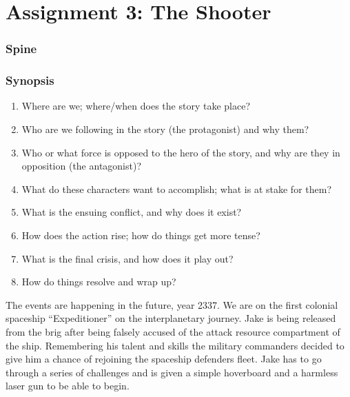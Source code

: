 \documentclass{article}
\begin{document}
\section*{Assignment 3: The Shooter}

\subsubsection*{Spine}

\subsubsection*{Synopsis}

\begin{enumerate}

  \item Where are we; where/when does the story take place?

  \item Who are we following in the story (the protagonist) and why them?

  \item Who or what force is opposed to the hero of the story, and why are they
    in opposition (the antagonist)?

  \item What do these characters want to accomplish; what is at stake for them?

  \item What is the ensuing conflict, and why does it exist?

  \item How does the action rise; how do things get more tense?

  \item What is the final crisis, and how does it play out?

  \item How do things resolve and wrap up?

\end{enumerate}

The events are happening in the future, year 2337. We are on the first colonial
spaceship ``Expeditioner'' on the interplanetary journey. Jake is being released
from the brig after being falsely accused of the attack resource compartment of
the ship. Remembering his talent and skills the military commanders decided to
give him a chance of rejoining the spaceship defenders fleet. Jake has to go
through a series of challenges and is given a simple hoverboard and a harmless
laser gun to be able to begin.
\end{document}

